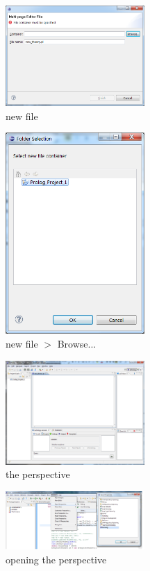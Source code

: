 \begin{figure}
  \includegraphics[width=200px]{images/plugin3.png}
  \caption{new \tuprolog{} file}\label{fig:plugin3}
\end{figure}

\begin{figure}
  \includegraphics[width=200px]{images/plugin4.png}
  \caption{new \tuprolog{} file $>$ Browse...}\label{fig:plugin4}
\end{figure}

\begin{figure}
  \includegraphics[width=200px]{images/plugin5.png}
  \caption{the \tuprolog{} perspective}\label{fig:plugin5}
\end{figure}

\begin{figure}
  \includegraphics[width=200px]{images/plugin6.png}
  \caption{opening the \tuprolog{} perspective}\label{fig:plugin6}
\end{figure}

